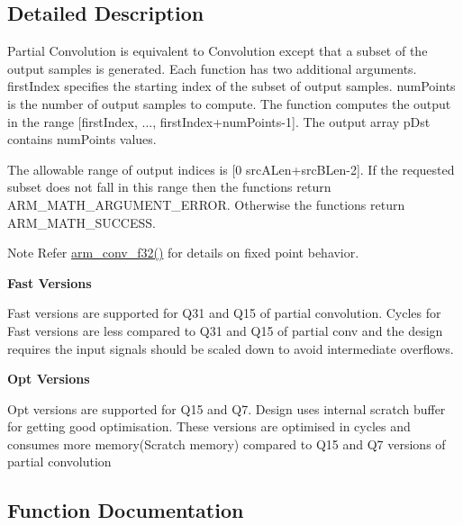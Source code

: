\subsection{Detailed Description}
Partial Convolution is equivalent to Convolution except that a subset of the output samples is generated. Each function has two additional arguments. {\ttfamily first\+Index} specifies the starting index of the subset of output samples. {\ttfamily num\+Points} is the number of output samples to compute. The function computes the output in the range {\ttfamily \mbox{[}first\+Index, ..., first\+Index+num\+Points-\/1\mbox{]}}. The output array {\ttfamily p\+Dst} contains {\ttfamily num\+Points} values.

The allowable range of output indices is \mbox{[}0 src\+A\+Len+src\+B\+Len-\/2\mbox{]}. If the requested subset does not fall in this range then the functions return A\+R\+M\+\_\+\+M\+A\+T\+H\+\_\+\+A\+R\+G\+U\+M\+E\+N\+T\+\_\+\+E\+R\+R\+OR. Otherwise the functions return A\+R\+M\+\_\+\+M\+A\+T\+H\+\_\+\+S\+U\+C\+C\+E\+SS. \begin{DoxyNote}{Note}
Refer \hyperlink{group__Conv_ga3f860dc98c6fc4cafc421e4a2aed3c89}{arm\+\_\+conv\+\_\+f32()} for details on fixed point behavior.
\end{DoxyNote}
{\bfseries Fast Versions}

\begin{DoxyParagraph}{}
Fast versions are supported for Q31 and Q15 of partial convolution. Cycles for Fast versions are less compared to Q31 and Q15 of partial conv and the design requires the input signals should be scaled down to avoid intermediate overflows.
\end{DoxyParagraph}
{\bfseries Opt Versions}

\begin{DoxyParagraph}{}
Opt versions are supported for Q15 and Q7. Design uses internal scratch buffer for getting good optimisation. These versions are optimised in cycles and consumes more memory(\+Scratch memory) compared to Q15 and Q7 versions of partial convolution 
\end{DoxyParagraph}


\subsection{Function Documentation}
